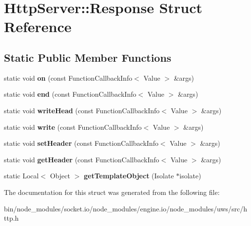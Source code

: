 \hypertarget{struct_http_server_1_1_response}{}\section{Http\+Server\+:\+:Response Struct Reference}
\label{struct_http_server_1_1_response}
\subsection*{Static Public Member Functions}
\begin{DoxyCompactItemize}
\item 
\mbox{\label{struct_http_server_1_1_response_a387115d4e28cb7df77a59d9a44c0962f}} 
static void {\bfseries on} (const Function\+Callback\+Info$<$ Value $>$ \&args)
\item 
\mbox{\label{struct_http_server_1_1_response_a62321cd3b50063ee2f188b1ecd71c6f3}} 
static void {\bfseries end} (const Function\+Callback\+Info$<$ Value $>$ \&args)
\item 
\mbox{\label{struct_http_server_1_1_response_ada485678cc6674d76474067d307e2537}} 
static void {\bfseries write\+Head} (const Function\+Callback\+Info$<$ Value $>$ \&args)
\item 
\mbox{\label{struct_http_server_1_1_response_a7b37aee62de193d1885c593d808fc26b}} 
static void {\bfseries write} (const Function\+Callback\+Info$<$ Value $>$ \&args)
\item 
\mbox{\label{struct_http_server_1_1_response_a59b648c0710bccae4300024c4c43f346}} 
static void {\bfseries set\+Header} (const Function\+Callback\+Info$<$ Value $>$ \&args)
\item 
\mbox{\label{struct_http_server_1_1_response_a040a255db79cb836cffe3b19da34f908}} 
static void {\bfseries get\+Header} (const Function\+Callback\+Info$<$ Value $>$ \&args)
\item 
\mbox{\label{struct_http_server_1_1_response_af503e60aef5e998c6186ba661f67b3fd}} 
static Local$<$ Object $>$ {\bfseries get\+Template\+Object} (Isolate $\ast$isolate)
\end{DoxyCompactItemize}


The documentation for this struct was generated from the following file\+:\begin{DoxyCompactItemize}
\item 
bin/node\+\_\+modules/socket.\+io/node\+\_\+modules/engine.\+io/node\+\_\+modules/uws/src/http.\+h\end{DoxyCompactItemize}
